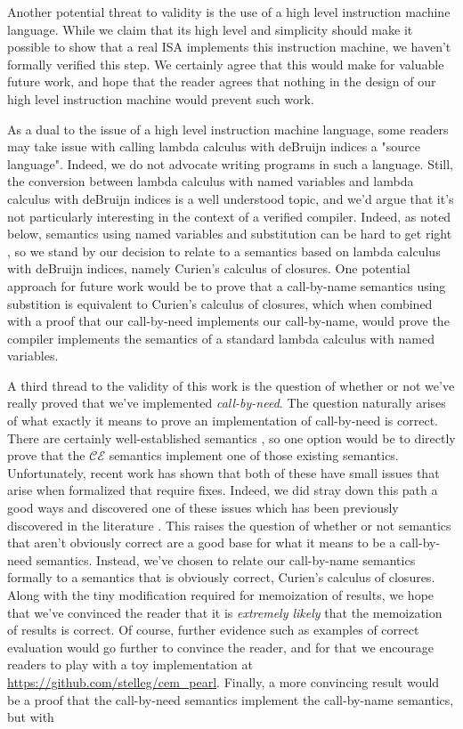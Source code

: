Another potential threat to validity is the use of a high level instruction
machine language. While we claim that its high level and simplicity should make
it possible to show that a real ISA implements this instruction machine, we
haven't formally verified this step. We certainly agree that this would make for
valuable future work, and hope that the reader agrees that nothing in the design
of our high level instruction machine would prevent such work.

As a dual to the issue of a high level instruction machine language, some
readers may take issue with calling lambda calculus with deBruijn indices a
"source language". Indeed, we do not advocate writing programs in such a
language. Still, the conversion between lambda calculus with named variables and
lambda calculus with deBruijn indices is a well understood topic, and we'd argue
that it's not particularly interesting in the context of a verified compiler.
Indeed, as noted below, semantics using named variables and substitution can be
hard to get right \cite{breitnerthesis, nakata2009small}, so we stand by our
decision to relate to a semantics based on lambda calculus with deBruijn
indices, namely Curien's calculus of closures. One potential approach for future
work would be to prove that a call-by-name semantics using substition is
equivalent to Curien's calculus of closures, which when combined with a proof
that our call-by-need implements our call-by-name, would prove the compiler
implements the semantics of a standard lambda calculus with named variables.

A third thread to the validity of this work is the question of whether or not
we've really proved that we've implemented \emph{call-by-need}. The question
naturally arises of what exactly it means to prove an implementation of
call-by-need is correct. There are certainly well-established semantics
\cite{launchburynatural, ariola1995call}, so one option would be to directly
prove that the $\mathcal{CE}$ semantics implement one of those existing
semantics.  Unfortunately, recent work has shown that both of these have small
issues that arise when formalized that require fixes. Indeed, we did stray down
this path a good ways and discovered one of these issues which has been
previously discovered in the literature \cite{nakata2009small}. This raises the
question of whether or not semantics that aren't obviously correct are a good
base for what it means to be a call-by-need semantics. Instead, we've chosen to
relate our call-by-name semantics formally to a semantics that is obviously
correct, Curien's calculus of closures. Along with the tiny modification
required for memoization of results, we hope that we've convinced the reader
that it is \emph{extremely likely} that the memoization of results is correct.
Of course, further evidence such as examples of correct evaluation would go
further to convince the reader, and for that we encourage readers to
play with a toy implementation at \url{https://github.com/stelleg/cem\_pearl}.
Finally, a more convincing result would be a proof that the call-by-need
semantics implement the call-by-name semantics, but with  

